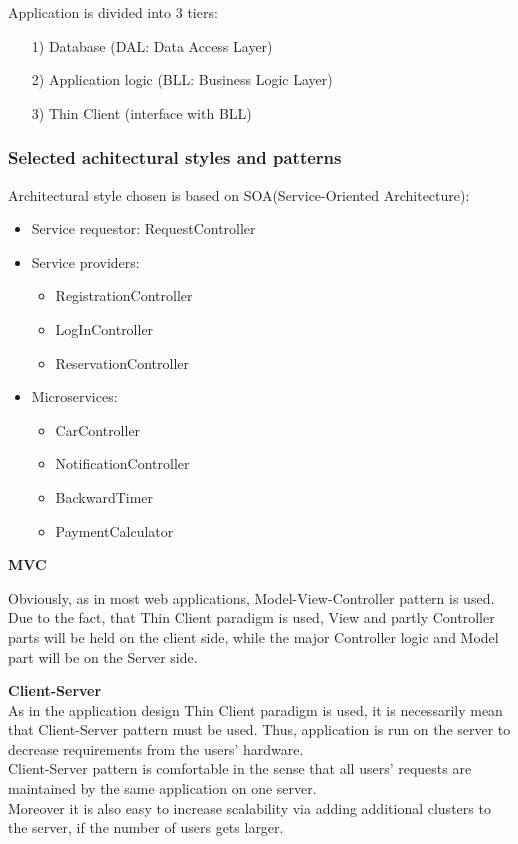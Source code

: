 \documentclass[12pt, letterpaper]{article}
\begin{document}
Application is divided into 3 tiers:
\begin{itemize}
	\item [1)] Database (DAL: Data Access Layer)
	\item [2)] Application logic (BLL: Business Logic Layer)
	\item [3)] Thin Client (interface with BLL)
\end{itemize}

\subsubsection{Selected achitectural styles and patterns}

Architectural style chosen is based on SOA(Service-Oriented Architecture):
\begin{itemize}
	\item Service requestor: RequestController
	\item Service providers:
	\begin{itemize}
		\item RegistrationController
		\item LogInController
		\item ReservationController
	\end{itemize}
	\item Microservices:
	\begin{itemize}
		\item CarController
		\item NotificationController
		\item BackwardTimer
		\item PaymentCalculator
	\end{itemize}
\end{itemize}

\vspace{0.5cm}
\textbf{MVC} \\
\vspace{0.5cm}

Obviously, as in most web applications, Model-View-Controller pattern is used. 
Due to the fact, that Thin Client paradigm is used, View and partly Controller parts will be held on the client side, while the major Controller logic and Model part will be on the Server side.    

\vspace{0.5cm}
\textbf{Client-Server} \\
\vspace{0.5cm}
As in the application design Thin Client paradigm is used, it is necessarily mean that Client-Server pattern must be used. Thus, application is run on the server to decrease requirements from the users' hardware. \\
Client-Server pattern is comfortable in the sense that all users' requests are maintained by the same application on one server. \\
Moreover it is also easy to increase scalability via adding additional clusters to the server, if the number of users gets larger. \\
\newpage
\end{document}
